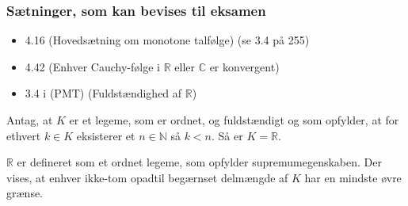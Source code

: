 \subsubsection{Sætninger, som kan bevises til eksamen}
\begin{itemize}
\item 4.16 (Hovedsætning om monotone talfølge) (se 3.4 på 255)
\item 4.42 (Enhver Cauchy-følge i $\mathbb{R}$ eller $\mathbb{C}$ er konvergent)
\item 3.4 i (PMT) (Fuldstændighed af $\mathbb{R}$)
\end{itemize}
\clearpage
\begin{theorem}Antag, at $K$ er et legeme, som er ordnet, og fuldstændigt og som opfylder, at for ethvert $k \in K$ eksisterer  et $n \in \mathbb{N}$ så $k < n$. Så er $K=\mathbb{R}$.
\end{theorem}
$\mathbb{R}$ er defineret som et ordnet legeme, som opfylder supremumegenskaben. Der vises, at enhver ikke-tom opadtil begærnset delmængde af $K$ har en mindste øvre grænse.

